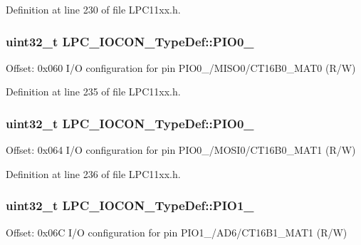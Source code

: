 Definition at line 230 of file L\+P\+C11xx.\+h.

\subsubsection[{\texorpdfstring{P\+I\+O0\+\_\+8}{PIO0_8}}]{ uint32\+\_\+t L\+P\+C\+\_\+\+I\+O\+C\+O\+N\+\_\+\+Type\+Def\+::\+P\+I\+O0\+\_}\hypertarget{group___l_p_c11xx___definitions_gae04ee957f0c17950e8ef72345e57e455}{}\label{group___l_p_c11xx___definitions_gae04ee957f0c17950e8ef72345e57e455}
Offset\+: 0x060 I/O configuration for pin P\+I\+O0\+\_/\+M\+I\+S\+O0/\+C\+T16\+B0\+\_\+\+M\+A\+T0 (R/W) 

Definition at line 235 of file L\+P\+C11xx.\+h.

\subsubsection[{\texorpdfstring{P\+I\+O0\+\_\+9}{PIO0_9}}]{ uint32\+\_\+t L\+P\+C\+\_\+\+I\+O\+C\+O\+N\+\_\+\+Type\+Def\+::\+P\+I\+O0\+\_}\hypertarget{group___l_p_c11xx___definitions_ga11fe7c8feaa2ef89a0eed742da824d04}{}\label{group___l_p_c11xx___definitions_ga11fe7c8feaa2ef89a0eed742da824d04}
Offset\+: 0x064 I/O configuration for pin P\+I\+O0\+\_/\+M\+O\+S\+I0/\+C\+T16\+B0\+\_\+\+M\+A\+T1 (R/W) 

Definition at line 236 of file L\+P\+C11xx.\+h.

\subsubsection[{\texorpdfstring{P\+I\+O1\+\_\+10}{PIO1_10}}]{ uint32\+\_\+t L\+P\+C\+\_\+\+I\+O\+C\+O\+N\+\_\+\+Type\+Def\+::\+P\+I\+O1\+\_}\hypertarget{group___l_p_c11xx___definitions_ga952de1f8b6cdc4f74c39ecc5997372dc}{}\label{group___l_p_c11xx___definitions_ga952de1f8b6cdc4f74c39ecc5997372dc}
Offset\+: 0x06C I/O configuration for pin P\+I\+O1\+\_/\+A\+D6/\+C\+T16\+B1\+\_\+\+M\+A\+T1 (R/W) 

